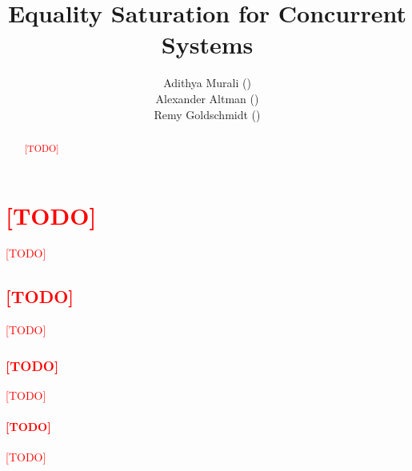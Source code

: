\documentclass[american,extrafontsizes,12pt,portrait,letterpaper,oneside,onecolumn,article,final,fleqn]{memoir}
\author{Adithya Murali (\email{adithya5@illinois.edu})\\Alexander Altman (\email{altman3@illinois.edu})\\Remy Goldschmidt (\email{regolds2@illinois.edu})}
\title{Equality Saturation for Concurrent Systems}
\date{}
\newcommand*\TODO{\textcolor{red}{[TODO]}\xspace}
\begin{document}
\checkandfixthelayout[nearest]
\midsloppy

\maketitle

\begin{abstract}
\TODO
\end{abstract}

\chapter{\TODO}

\TODO

\section{\TODO}

\TODO

\subsection{\TODO}

\TODO

\subsubsection{\TODO}

\TODO
\end{document}
